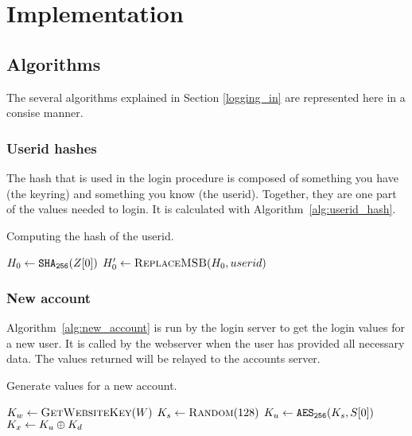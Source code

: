 \section{Implementation}

\subsection{Algorithms}
The several algorithms explained in Section \ref{logging_in} are represented here in a consise manner.
\subsubsection{Userid hashes}
The hash that is used in the login procedure is composed of something you have
(the keyring)
and something you know
(the userid).
Together,
they are one part of the values needed to login.
It is calculated with Algorithm~\vref{alg:userid_hash}.
\begin{algorithm}
\caption{Computing the hash of the userid.}
\label{alg:userid_hash}
\begin{algorithmic}[1]
\State $H_0\gets\texttt{\ensuremath{\mathtt{SHA_{256}}}}(Z[0])$
\State $H_0'\gets\Call{ReplaceMSB}{H_0,userid}$
\State {}
\EndProcedure
\end{algorithmic}
\end{algorithm}
\subsubsection{New account}
Algorithm~\vref{alg:new_account} is run by the login server to get the login values for a new user.
It is called by the webserver when the user has provided all necessary data.
The values returned will be relayed to the accounts server.
\begin{algorithm}
\caption{Generate values for a new account.}
\label{alg:new_account}
\begin{algorithmic}[1]
\State $K_w\gets\Call{GetWebsiteKey}{W}$	
\State $K_s\gets\Call{Random}{128}$
\State $K_u\gets\texttt{\ensuremath{\mathtt{AES_{256}}}}(K_s,S[0])$ 
\State $K_x\gets K_u\oplus K_d$ 
\State {} 
\EndProcedure
\end{algorithmic}
\end{algorithm}
\par
